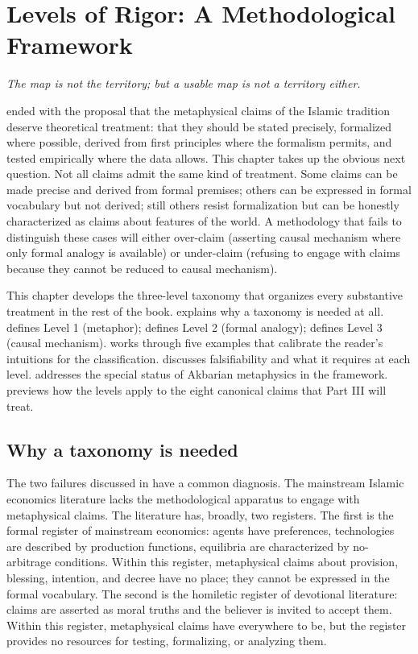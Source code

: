 \chapter{Levels of Rigor: A Methodological Framework}
\label{ch:levels-of-rigor}

\epigraph{\itshape The map is not the territory; but a usable map is
not a territory either.}{}

\noindent
{} ended with the proposal that the metaphysical
claims of the Islamic tradition deserve theoretical treatment: that
they should be stated precisely, formalized where possible, derived
from first principles where the formalism permits, and tested
empirically where the data allows. This chapter takes up the obvious
next question. Not all claims admit the same kind of treatment. Some
claims can be made precise and derived from formal premises; others
can be expressed in formal vocabulary but not derived; still others
resist formalization but can be honestly characterized as claims
about features of the world. A methodology that fails to distinguish
these cases will either over-claim (asserting causal mechanism where
only formal analogy is available) or under-claim (refusing to
engage with claims because they cannot be reduced to causal mechanism).

This chapter develops the three-level taxonomy that organizes every
substantive treatment in the rest of the book. 
explains why a taxonomy is needed at all.  defines
Level 1 (metaphor);  defines Level 2 (formal
analogy);  defines Level 3 (causal mechanism).
 works through five examples that calibrate
the reader's intuitions for the classification. 
discusses falsifiability and what it requires at each level.
 addresses the special status of Akbarian
metaphysics in the framework.  previews how the
levels apply to the eight canonical claims that Part III will treat.

\section{Why a taxonomy is needed}
\label{sec:why-taxonomy}

The two failures discussed in  have a common
diagnosis. The mainstream Islamic economics literature lacks the
methodological apparatus to engage with metaphysical claims. The
literature has, broadly, two registers. The first is the formal
register of mainstream economics: agents have preferences, technologies
are described by production functions, equilibria are characterized
by no-arbitrage conditions. Within this register, metaphysical claims
about provision, blessing, intention, and decree have no place; they
cannot be expressed in the formal vocabulary. The second is the
homiletic register of devotional literature: claims are asserted as
moral truths and the believer is invited to accept them. Within this
register, metaphysical claims have everywhere to be, but the
register provides no resources for testing, formalizing, or
analyzing them.

